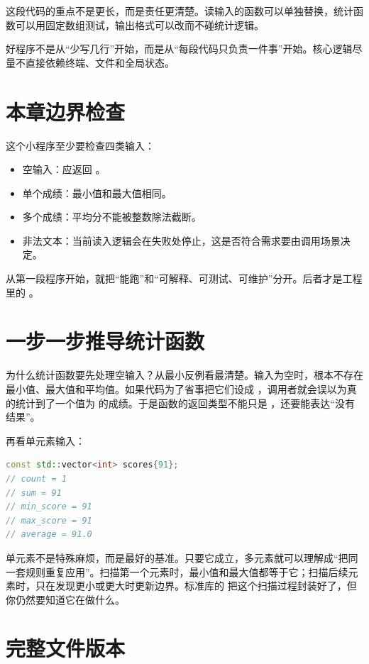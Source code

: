 这段代码的重点不是更长，而是责任更清楚。读输入的函数可以单独替换，统计函数可以用固定数组测试，输出格式可以改而不碰统计逻辑。

\begin{keyidea}
好程序不是从“少写几行”开始，而是从“每段代码只负责一件事”开始。核心逻辑尽量不直接依赖终端、文件和全局状态。
\end{keyidea}

\section{本章边界检查}

这个小程序至少要检查四类输入：

\begin{itemize}
  \item 空输入：应返回 。
  \item 单个成绩：最小值和最大值相同。
  \item 多个成绩：平均分不能被整数除法截断。
  \item 非法文本：当前读入逻辑会在失败处停止，这是否符合需求要由调用场景决定。
\end{itemize}

从第一段程序开始，就把“能跑”和“可解释、可测试、可维护”分开。后者才是工程里的 \cpp。

\section{一步一步推导统计函数}

为什么统计函数要先处理空输入？从最小反例看最清楚。输入为空时，根本不存在最小值、最大值和平均值。如果代码为了省事把它们设成 ，调用者就会误以为真的统计到了一个值为  的成绩。于是函数的返回类型不能只是 ，还要能表达“没有结果”。

再看单元素输入：

\begin{lstlisting}[language=C++,caption={单元素时每个字段都能推导出来}]
const std::vector<int> scores{91};
// count = 1
// sum = 91
// min_score = 91
// max_score = 91
// average = 91.0
\end{lstlisting}

单元素不是特殊麻烦，而是最好的基准。只要它成立，多元素就可以理解成“把同一套规则重复应用”。扫描第一个元素时，最小值和最大值都等于它；扫描后续元素时，只在发现更小或更大时更新边界。标准库的  把这个扫描过程封装好了，但你仍然要知道它在做什么。

\section{完整文件版本}

